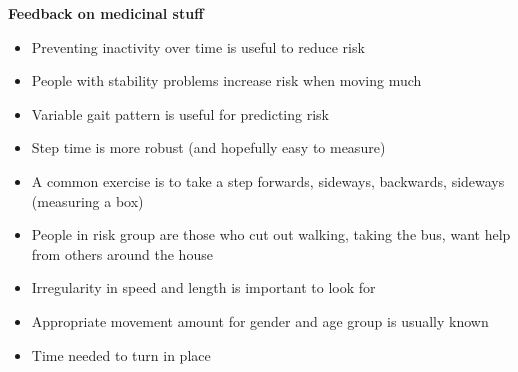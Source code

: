 \textbf{Feedback on medicinal stuff}
\begin{itemize}
\item Preventing inactivity over time is useful to reduce risk
\item People with stability problems increase risk when moving much
\item Variable gait pattern is useful for predicting risk
\item Step time is more robust (and hopefully easy to measure)
\item A common exercise is to take a step forwards, sideways, backwards, sideways (measuring a box)
\item People in risk group are those who cut out walking, taking the bus, want help from others around the house
\item Irregularity in speed and length is important to look for
\item Appropriate movement amount for gender and age group is usually known
\item Time needed to turn in place
\end{itemize}